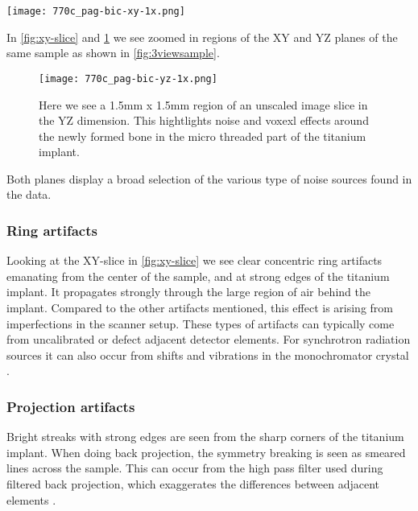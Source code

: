 \begin{figure*}
\centering
\texttt{[image: 770c\_pag-bic-xy-1x.png]}
\caption{Here we see a 1mm x 2mm region of an unscaled image slice in the XY dimension. It highlights
some of the imperfections and noise present in the data. We especially see artifacts within and
around the titanium implant.}
\label{fig:xy-slice}
\end{figure*}

In \cref{fig:xy-slice} and \cref{fig:yz-slice} we see zoomed in regions of the XY and YZ planes
of the same sample as shown in \cref{fig:3viewsample}.

\begin{figure}
\centering
\texttt{[image: 770c\_pag-bic-yz-1x.png]}
\caption{Here we see a 1.5mm x 1.5mm region of an unscaled image slice in the YZ dimension. This
hightlights noise and voxexl effects around the newly formed bone in the micro threaded part of
the titanium implant.}
\label{fig:yz-slice}
\end{figure}

Both planes display a broad selection of the various type of noise sources found in the data.

\subsubsection{Ring artifacts}

Looking at the XY-slice in \cref{fig:xy-slice} we see clear concentric ring artifacts emanating from
the center of the sample, and at strong edges of the titanium implant. It propagates strongly through
the large region of air behind the implant. Compared to the other artifacts mentioned, this effect is
arising from imperfections in the scanner setup. These types of artifacts can typically come from
uncalibrated or defect adjacent detector elements. For synchrotron radiation sources it can also
occur from shifts and vibrations in the monochromator crystal \citep{ringartifacts}.

\subsubsection{Projection artifacts}

Bright streaks with strong edges are seen from the sharp corners of the titanium implant. When
doing back projection, the symmetry breaking is seen as smeared lines across the sample. This
can occur from the high pass filter used during filtered back projection, which exaggerates the
differences between adjacent elements \citep{ctnoise}.

